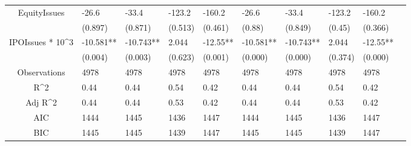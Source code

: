 \documentclass{article}
\begin{document}
\begin{table}[H]
\begin{tabular}{|clllllllll|}
  EquityIssues & -26.6 & -33.4 & -123.2 & -160.2 & -26.6 & -33.4 & -123.2 & -160.2 & \\ 
   & (0.897) & (0.871) & (0.513) & (0.461) & (0.88) & (0.849) & (0.45) & (0.366) & \\ 
  IPOIssues * 10^3 & -10.581** & -10.743** & 2.044 & -12.55** & -10.581** & -10.743** & 2.044 & -12.55** & \\ 
   & (0.004) & (0.003) & (0.623) & (0.001) & (0.000) & (0.000) & (0.374) & (0.000) & \\ 
  \hline 
 Observations & 4978 & 4978 & 4978 & 4978 & 4978 & 4978 & 4978 & 4978 & \\ 
  R^2 & 0.44 & 0.44 & 0.54 & 0.42 & 0.44 & 0.44 & 0.54 & 0.42 & \\ 
  Adj R^2 & 0.44 & 0.44 & 0.53 & 0.42 & 0.44 & 0.44 & 0.53 & 0.42 & \\ 
  AIC & 1444 & 1445 & 1436 & 1447 & 1444 & 1445 & 1436 & 1447 & \\ 
  BIC & 1445 & 1445 & 1439 & 1447 & 1445 & 1445 & 1439 & 1447 & \\ 
   \hline
\end{tabular}
 
\end{table}
\end{document}
